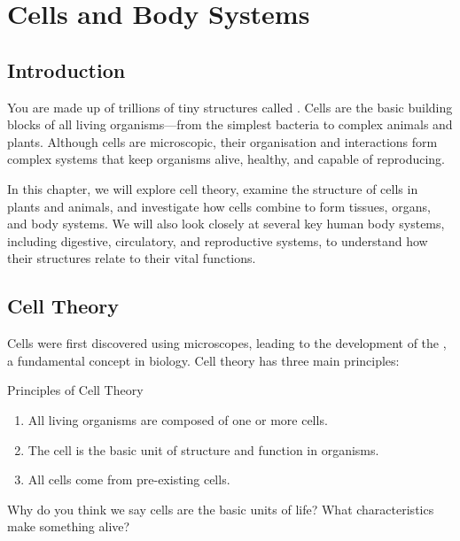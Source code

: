\chapter{Cells and Body Systems}

\section{Introduction}

You are made up of trillions of tiny structures called . Cells are the basic building blocks of all living organisms—from the simplest bacteria to complex animals and plants. Although cells are microscopic, their organisation and interactions form complex systems that keep organisms alive, healthy, and capable of reproducing.

In this chapter, we will explore cell theory, examine the structure of cells in plants and animals, and investigate how cells combine to form tissues, organs, and body systems. We will also look closely at several key human body systems, including digestive, circulatory, and reproductive systems, to understand how their structures relate to their vital functions.

\section{Cell Theory}


Cells were first discovered using microscopes, leading to the development of the , a fundamental concept in biology. Cell theory has three main principles:

\begin{keyconcept}{Principles of Cell Theory}
\begin{enumerate}
    \item All living organisms are composed of one or more cells.
    \item The cell is the basic unit of structure and function in organisms.
    \item All cells come from pre-existing cells.
\end{enumerate}
\end{keyconcept}

\begin{stopandthink}
Why do you think we say cells are the basic units of life? What characteristics make something alive?
\end{stopandthink}

